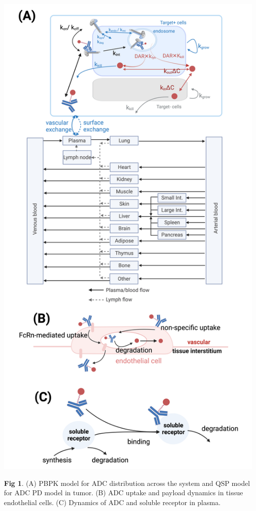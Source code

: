 \documentclass[portrait,fontscale=0.3,paperwidth=36in,paperheight=48in]{baposter}
\begin{document}
\begin{poster}
{\begin{minipage}{\textwidth}
\centering
	\includegraphics[width= 0.98 \textwidth]{../img/adc-distribution-diagram}

\scriptsize{\textbf{Fig 1}. (A) PBPK model for ADC distribution across the system and QSP model for ADC PD model in tumor. 
		(B) ADC uptake and payload dynamics in tissue endothelial cells. (C) Dynamics of ADC and soluble receptor in plasma. }
\end{minipage}

}
\end{poster}
\end{document}
